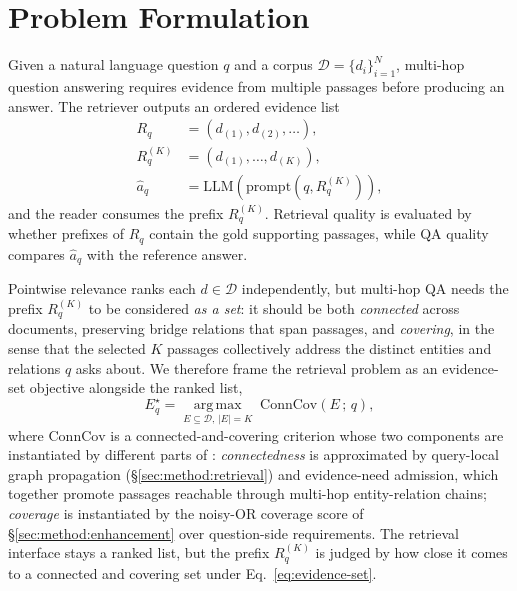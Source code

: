 %
%
%

\section{Problem Formulation}
\label{sec:problem}

Given a natural language question $q$ and a corpus
$\mathcal{D}=\{d_i\}_{i=1}^{N}$, multi-hop question answering
requires evidence from multiple passages before producing an answer.
The retriever outputs an ordered evidence list
\[
\begin{aligned}
R_q &= (d_{(1)},d_{(2)},\ldots), \\
R_q^{(K)} &= (d_{(1)},\ldots,d_{(K)}), \\
\hat{a}_q &= \mathrm{LLM}(\mathrm{prompt}(q,R_q^{(K)})),
\end{aligned}
\]
and the reader consumes the prefix $R_q^{(K)}$. Retrieval quality
is evaluated by whether prefixes of $R_q$ contain the gold
supporting passages, while QA quality compares $\hat{a}_q$ with
the reference answer.

Pointwise relevance ranks each $d \in \mathcal{D}$ independently,
but multi-hop QA needs the prefix $R_q^{(K)}$ to be considered
\emph{as a set}: it should be both \emph{connected} across
documents, preserving bridge relations that span passages, and
\emph{covering}, in the sense that the selected $K$ passages
collectively address the distinct entities and relations $q$ asks
about. We therefore frame the retrieval problem as an evidence-set
objective alongside the ranked list,
\begin{equation}
\label{eq:evidence-set}
E_q^{\star}
=
\operatorname*{arg\,max}_{E \subseteq \mathcal{D},\,|E|=K}
\;\mathrm{ConnCov}(E\,;\,q),
\end{equation}
where $\mathrm{ConnCov}$ is a connected-and-covering criterion
whose two components are instantiated by different parts of
\methodname{}: \emph{connectedness} is approximated by query-local
graph propagation (\S\ref{sec:method:retrieval}) and evidence-need
admission, which together promote passages reachable through
multi-hop entity-relation chains; \emph{coverage} is instantiated
by the noisy-OR coverage score of
\S\ref{sec:method:enhancement} over question-side requirements.
The retrieval interface stays a ranked list, but the prefix
$R_q^{(K)}$ is judged by how close it comes to a connected and
covering set under Eq.~\ref{eq:evidence-set}.

